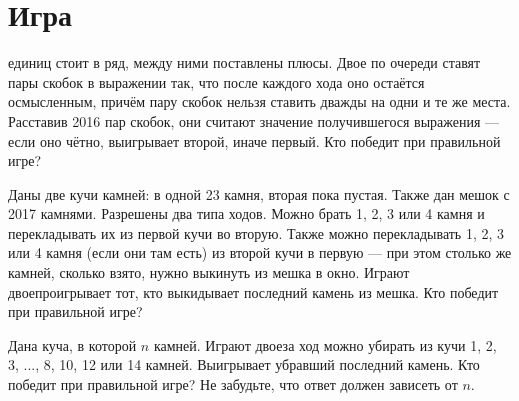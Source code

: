 \section{Игра}
\begin{itemize}

 единиц стоит в ряд, между ними поставлены плюсы. Двое по очереди ставят пары скобок в выражении так, что после каждого хода оно остаётся осмысленным, причём пару скобок нельзя ставить дважды на одни и те же места. Расставив 2016 пар скобок, они считают значение получившегося выражения — если оно чётно, выигрывает второй, иначе первый. Кто победит при правильной игре?

\itB Даны две кучи камней: в одной 23 камня, вторая пока пустая. Также дан мешок с 2017 камнями. Разрешены два типа ходов. Можно брать 1, 2, 3 или 4 камня и перекладывать их из первой кучи во вторую. Также можно перекладывать 1, 2, 3 или 4 камня (если они там есть) из второй кучи в первую — при этом столько же камней, сколько взято, нужно выкинуть из мешка в окно. Играют двое\scolon проигрывает тот, кто выкидывает последний камень из мешка. Кто победит при правильной игре?

\itC Дана куча, в которой $n$ камней. Играют двое\scolon за ход можно убирать из кучи 1, 2, 3, ..., 8, 10, 12 или 14 камней. Выигрывает убравший последний камень. Кто победит при правильной игре? Не забудьте, что ответ должен зависеть от $n$.
\end{itemize}